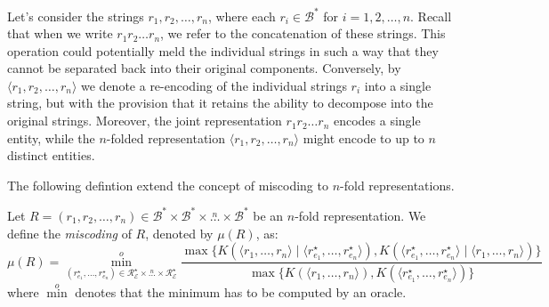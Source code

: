 Let's consider the strings $r_1, r_2, \ldots, r_n$, where each $r_i \in \mathcal{B}^\ast$ for $i=1, 2, \ldots, n$. Recall that when we write $r_1 r_2 \ldots r_n$, we refer to the concatenation of these strings. This operation could potentially meld the individual strings in such a way that they cannot be separated back into their original components. Conversely, by $\langle r_1, r_2, \ldots, r_n \rangle$ we denote a re-encoding of the individual strings $r_i$ into a single string, but with the provision that it retains the ability to decompose into the original strings. Moreover, the joint representation $r_1 r_2 \ldots r_n$ encodes a single entity, while the $n$-folded representation $\langle r_1, r_2, \ldots, r_n \rangle$ might encode to up to $n$ distinct entities.

The following defintion extend the concept of miscoding to $n$-fold representations.

\begin{definition}
Let $R = \left( r_1, r_2, \ldots, r_n \right) \in \mathcal{B}^\ast \times \mathcal{B}^\ast \times \overset{n} \ldots \times \mathcal{B}^\ast$  be an $n$-fold representation. We define the \emph{miscoding} of $R$, denoted by $\mu(R)$, as:
\[
\mu(R) = \overset{o}{ \underset{ (r^\star_{e_1}, \ldots, r^\star_{e_n}) \in \mathcal{R}^\star_\mathcal{E} \times \overset{n} \ldots \times \mathcal{R}^\star_\mathcal{E} } \min} \frac{ \max\{ K \left( \langle r_1, \ldots, r_n \rangle \mid \langle r^\star_{e_1}, \ldots, r^\star_{e_n} \rangle \right), K \left( \langle  r^\star_{e_1}, \ldots, r^\star_{e_n} \rangle \mid \langle r_1, \ldots, r_n \rangle \right) \} } { \max\{ K \left( \langle r_1, \ldots, r_n \rangle \right), K \left( \langle r^\star_{e_1}, \ldots, r^\star_{e_n} \rangle \right) \} }
\]
where $\overset{o}{\min}$ denotes that the minimum has to be computed by an oracle.
\end{definition}

